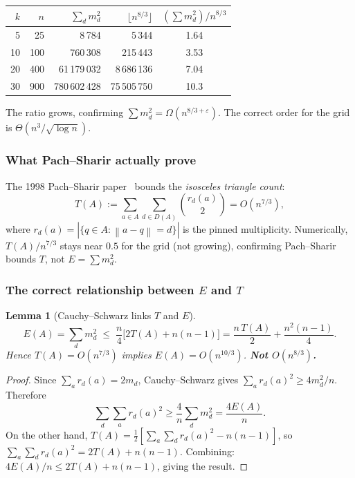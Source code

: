 \documentclass[12pt,a4paper]{amsart}
\theoremstyle{plain}
\newtheorem{lemma}[theorem]{Lemma}
\theoremstyle{definition}
\newcommand{\norm}[1]{\left\lVert #1 \right\rVert}
\begin{document}
\begin{center}
\begin{tabular}{rrrrc}
\toprule
$k$ & $n$ & $\sum_d m_d^2$ & $\lfloor n^{8/3}\rfloor$ &
  $(\sum m_d^2)/n^{8/3}$ \\
\midrule
 5 &   25 &           8\,784 &     5\,344 & 1.64 \\
10 &  100 &         760\,308 &   215\,443 & 3.53 \\
20 &  400 &      61\,179\,032 & 8\,686\,136 & 7.04 \\
30 &  900 &     780\,602\,428 & 75\,505\,750 & 10.3 \\
\bottomrule
\end{tabular}
\end{center}
The ratio grows, confirming $\sum m_d^2 = \Omega(n^{8/3+\varepsilon})$.
The correct order for the grid is $\Theta(n^3/\sqrt{\log n})$.

\subsubsection{What Pach--Sharir actually prove}

The 1998 Pach--Sharir paper~\cite{PS98} bounds the \emph{isosceles
triangle count}:
\[
  T(A) := \sum_{a\in A}\sum_{d\in D(A)}\binom{r_d(a)}{2} = O(n^{7/3}),
\]
where $r_d(a)=|\{q\in A:\norm{a-q}=d\}|$ is the pinned multiplicity.
Numerically, $T(A)/n^{7/3}$ stays near $0.5$ for the grid (not growing),
confirming Pach--Sharir bounds $T$, not $E=\sum m_d^2$.

\subsubsection{The correct relationship between $E$ and $T$}

\begin{lemma}[Cauchy--Schwarz links $T$ and $E$]
\label{lem:ET}
\[
  E(A) = \sum_d m_d^2 \;\le\; \frac{n}{4}\bigl[2T(A)+n(n-1)\bigr]
  = \frac{n\,T(A)}{2} + \frac{n^2(n-1)}{4}.
\]
Hence $T(A)=O(n^{7/3})$ implies $E(A)=O(n^{10/3})$.
\textbf{Not $O(n^{8/3})$.}
\end{lemma}

\begin{proof}
Since $\sum_a r_d(a)=2m_d$, Cauchy--Schwarz gives
$\sum_a r_d(a)^2\ge 4m_d^2/n$.  Therefore
\[
  \sum_d\sum_a r_d(a)^2 \ge \frac{4}{n}\sum_d m_d^2 = \frac{4E(A)}{n}.
\]
On the other hand,
$T(A)=\frac{1}{2}\!\left[\sum_a\sum_d r_d(a)^2 - n(n-1)\right]$,
so $\sum_a\sum_d r_d(a)^2 = 2T(A)+n(n-1)$.
Combining: $4E(A)/n \le 2T(A)+n(n-1)$, giving the result.
\end{proof}
\end{document}

